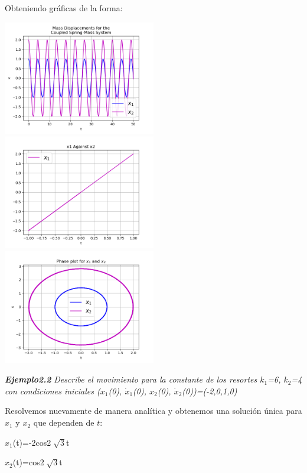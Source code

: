 \documentclass{article}
\begin{document}
Obteniendo gráficas de la forma:

\begin{center}
\includegraphics[height=5cm]{Ejemplo2_1_pt1.png}
\includegraphics[height=5cm]{ejemplo2_1_p2.png}
\includegraphics[height=5cm]{Ejemplo2_1_pt3.png}
\end{center}

\textbf{\textit{Ejemplo2.2}}
\textit{Describe el movimiento para la constante de los resortes $k_1$=6, $k_2$=4 con condiciones iniciales ($x_1$(0), $\dot{x}_1$(0), $x_2$(0), $\dot{x}_2$(0))=(-2,0,1,0)}

Resolvemos nuevamente de manera analítica y obtenemos una solución única para $x_1$ y $x_2$ que dependen de $t$:

\begin{center}
$x_1$(t)=-2cos2$\sqrt[]{3}$t
\end{center}

\begin{center}
$x_2$(t)=cos2$\sqrt[]{3}$t
\end{center}
\end{document}
